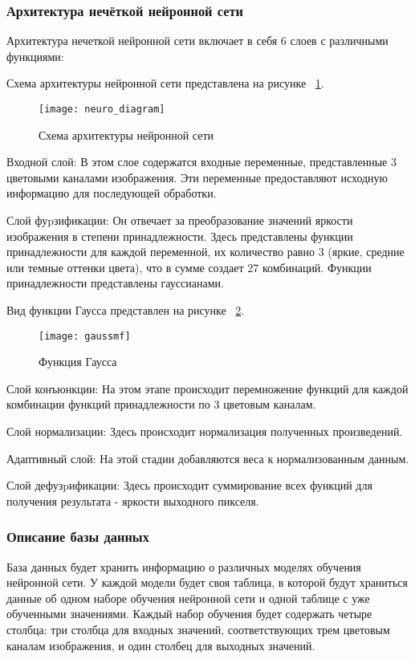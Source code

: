 \subsubsection{Архитектура нечёткой нейронной сети}

Архитектура нечеткой нейронной сети включает в себя 6 слоев с различными функциями:

Схема архитектуры нейронной сети представлена на рисунке ~\ref{neuro_diagram:image}.

\begin{figure}[ht]
\texttt{[image: neuro\_diagram]}
\caption{Схема архитектуры нейронной сети}
\label{neuro_diagram:image}
\end{figure}

Входной слой: В этом слое содержатся входные переменные, представленные 3 цветовыми каналами изображения. Эти переменные предоставляют исходную информацию для последующей обработки.

Слой фуpзификации: Он отвечает за преобразование значений яркости изображения в степени принадлежности. Здесь представлены функции принадлежности для каждой переменной, их количество равно 3 (яркие, средние или темные оттенки цвета), что в сумме создает 27 комбинаций. Функции принадлежности представлены гауссианами.

Вид функции Гаусса представлен на рисунке ~\ref{gaussmf:image}.

\begin{figure}[ht]
\texttt{[image: gaussmf]}
\caption{Функция Гаусса}
\label{gaussmf:image}
\end{figure}

Слой конъюнкции: На этом этапе происходит перемножение функций для каждой комбинации функций принадлежности по 3 цветовым каналам.

Слой нормализации: Здесь происходит нормализация полученных произведений.

Адаптивный слой: На этой стадии добавляются веса к нормализованным данным.

Слой дефузpификации: Здесь происходит суммирование всех функций для получения результата - яркости выходного пикселя.

\subsubsection{Описание базы данных}

База данных будет хранить информацию о различных моделях обучения нейронной сети. У каждой модели будет своя таблица, в которой будут храниться данные об одном наборе обучения нейронной сети и одной таблице с уже обученными значениями. Каждый набор обучения будет содержать четыре столбца: три столбца для входных значений, соответствующих трем цветовым каналам изображения, и один столбец для выходных значений.

